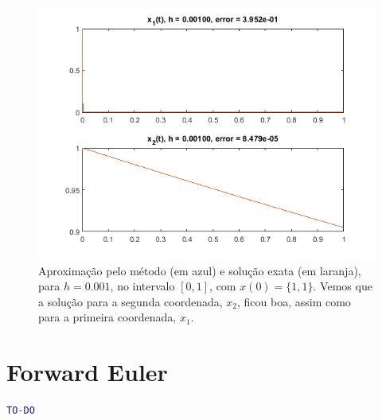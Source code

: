 \documentclass{article}
\begin{document}
\begin{enumerate}
\begin{enumerate}
                \begin{figure}[!h]
                    \centering
                    \includegraphics[width=\textwidth]{forward_3.png}
                    \caption{Aproximação pelo método (em azul) e
                    solução exata (em laranja), para $h = 0.001$,
                    no intervalo $[0, 1]$, com $x(0) = \{1, 1\}$.
                    Vemos que a solução para a segunda
                    coordenada, $x_2$, ficou boa, assim como para a primeira
                    coordenada, $x_1$.}
                    \label{fig:forward_3}
                \end{figure}
            \end{enumerate} 
    \end{enumerate}

    \clearpage

    \appendix

    \section{Forward Euler}
        \label{appendix:forward_euler}

        \begin{lstlisting}[language=Matlab]
            TO-DO
        \end{lstlisting}
\end{document}
